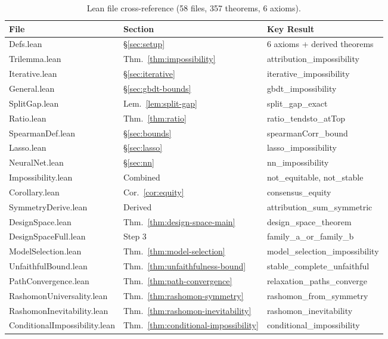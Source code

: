\documentclass{article}
\begin{document}
\begin{table}[t]
\centering
\caption{Lean file cross-reference (58 files, 357 theorems, 6 axioms).}
\label{tab:lean-crossref}
\footnotesize
\begin{tabular}{@{}lll@{}}
\toprule
\textbf{File} & \textbf{Section} & \textbf{Key Result} \\
\midrule
Defs.lean & \S\ref{sec:setup} & 6 axioms + derived theorems \\
Trilemma.lean & Thm.~\ref{thm:impossibility} & attribution\_impossibility \\
Iterative.lean & \S\ref{sec:iterative} & iterative\_impossibility \\
General.lean & \S\ref{sec:gbdt-bounds} & gbdt\_impossibility \\
SplitGap.lean & Lem.~\ref{lem:split-gap} & split\_gap\_exact \\
Ratio.lean & Thm.~\ref{thm:ratio} & ratio\_tendsto\_atTop \\
SpearmanDef.lean & \S\ref{sec:bounds} & spearmanCorr\_bound \\
Lasso.lean & \S\ref{sec:lasso} & lasso\_impossibility \\
NeuralNet.lean & \S\ref{sec:nn} & nn\_impossibility \\
Impossibility.lean & Combined & not\_equitable, not\_stable \\
Corollary.lean & Cor.~\ref{cor:equity} & consensus\_equity \\
SymmetryDerive.lean & Derived & attribution\_sum\_symmetric \\
DesignSpace.lean & Thm.~\ref{thm:design-space-main} & design\_space\_theorem \\
DesignSpaceFull.lean & Step 3 & family\_a\_or\_family\_b \\
ModelSelection.lean & Thm.~\ref{thm:model-selection} & model\_selection\_impossibility \\
UnfaithfulBound.lean & Thm.~\ref{thm:unfaithfulness-bound} & stable\_complete\_unfaithful \\
PathConvergence.lean & Thm.~\ref{thm:path-convergence} & relaxation\_paths\_converge \\
RashomonUniversality.lean & Thm.~\ref{thm:rashomon-symmetry} & rashomon\_from\_symmetry \\
RashomonInevitability.lean & Thm.~\ref{thm:rashomon-inevitability} & rashomon\_inevitability \\
ConditionalImpossibility.lean & Thm.~\ref{thm:conditional-impossibility} & conditional\_impossibility \\

\end{tabular}
\end{table}
\end{document}
